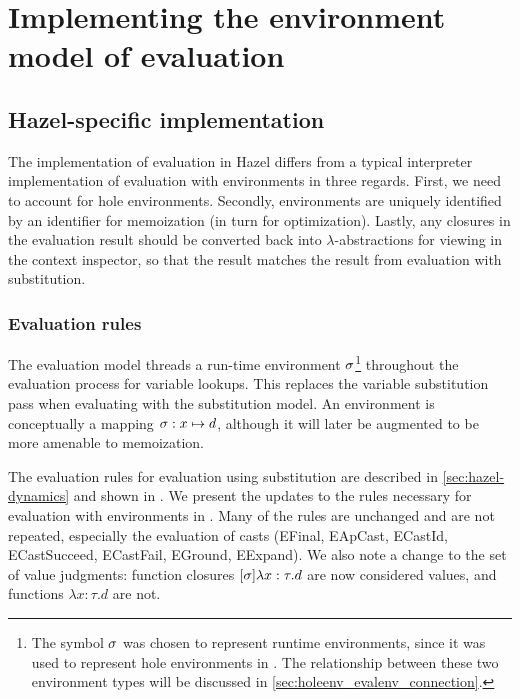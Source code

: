 \chapter{Implementing the environment model of evaluation}
\label{sec:env_model_evaluation}

\section{Hazel-specific implementation}
\label{sec:eval_with_envs}

The implementation of evaluation in Hazel differs from a typical interpreter implementation of evaluation with environments in three regards. First, we need to account for hole environments. Secondly, environments are uniquely identified by an identifier for memoization (in turn for optimization). Lastly, any closures in the evaluation result should be converted back into $\lambda$-abstractions for viewing in the context inspector, so that the result matches the result from evaluation with substitution.

\subsection{Evaluation rules}
\label{sec:evalenv-rules}

The evaluation model threads a run-time environment $\sigma$\footnote{The symbol $\sigma$ was chosen to represent runtime environments, since it was used to represent hole environments in \cite{conf/popl/HazelnutLive19}. The relationship between these two environment types will be discussed in \cref{sec:holeenv_evalenv_connection}.} throughout the evaluation process for variable lookups. This replaces the variable substitution pass when evaluating with the substitution model. An environment is conceptually a mapping $\sigma:x\mapsto d$, although it will later be augmented to be more amenable to memoization.

The evaluation rules for evaluation using substitution are described in \cref{sec:hazel-dynamics} and shown in . We present the updates to the rules necessary for evaluation with environments in . Many of the rules are unchanged and are not repeated, especially the evaluation of casts (EFinal, EApCast, ECastId, ECastSucceed, ECastFail, EGround, EExpand). We also note a change to the set of value judgments: function closures $[\sigma]\lambda x:\tau.d$ are now considered values, and functions $\lambda x:\tau.d$ are not.


